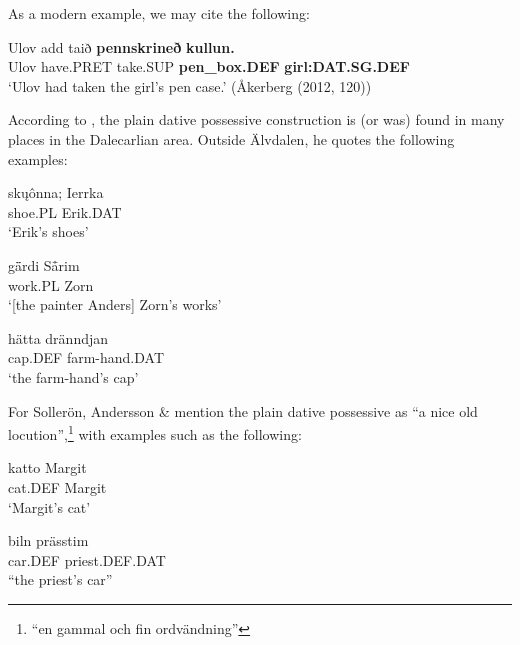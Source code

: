 As a modern example, we may cite the following:


\ea\label{}
\gll Ulov  add  taið  \textbf{pennskrineð} \textbf{kullun.}\\
Ulov  have.PRET  take.SUP  \textbf{pen\_box.DEF} \textbf{girl:DAT.SG.DEF}\\
\glt ‘Ulov had taken the girl’s pen case.’ (Åkerberg (2012, 120))
\z

According to \citet[112]{Levander1928}, the plain dative possessive construction is (or was) found in many places in the Dalecarlian area. Outside Älvdalen, he quotes the following examples:


\ea\label{}
\gll sk\k{u}ônna;  Ierrka\\
shoe.PL  Erik.DAT\\
\glt ‘Erik’s shoes’
\z

\ea\label{}
\gll g\={ä}rdi  S\={å}rim\\
work.PL  Zorn\\
\glt ‘[the painter Anders] Zorn’s works’ 
\z

\ea\label{}
\gll hätta  dränndjan\\
cap.DEF  farm-hand.DAT\\
\glt ‘the farm-hand’s cap’
\z

For Sollerön, Andersson \& \citet[357]{Danielsson1999} mention the plain dative possessive as “a nice old locution”,\footnote{ “en gammal och fin ordvändning”} with examples such as the following:


\ea\label{}
\gll katto  Margit\\
cat.DEF  Margit\\
\glt ‘Margit’s cat’
\z

\ea\label{}
\gll biln  prässtim\\
car.DEF  priest.DEF.DAT\\
\glt “the priest’s car”
\z

